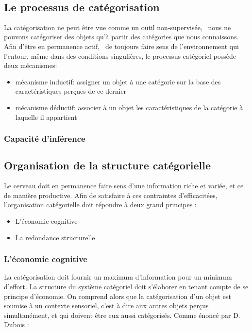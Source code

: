  \\

\subsection{Le processus de catégorisation}

La catégorisation ne peut être vue comme un outil non-supervisée, \ie~nous ne pouvons catégoriser des objets qu'à partir des catégories que nous connaissons. Afin d'être en permanence actif, \ie~de toujours faire sens de l'environnement qui l'entour, même dans des conditions singulières, le processus catégoriel possède deux mécanismes:

\begin{itemize}
\item mécanisme inductif: assigner un objet à une catégorie sur la base des caractéristiques perçues de ce dernier
\item mécanisme déductif: associer à un objet les caractéristiques de la catégorie à laquelle il appartient
\end{itemize}

\subsubsection{Capacité d'inférence}

\subsection{Organisation de la structure catégorielle}

Le cerveau doit en permanence faire sens d'une information riche et variée, et ce de manière productive. Afin de satisfaire à ces contraintes d'efficacitées, l'organisation catégorielle doit répondre à deux grand principes \citep[p. 29]{rosch1978cognition}:

\begin{itemize}
\item L'économie cognitive
\item La redondance structurelle
\end{itemize}

\subsubsection{L'économie cognitive}

La catégorisation doit fournir un maximum d'information pour un minimum d'effort. La structure du système catégoriel doit s'élaborer en tenant compte de se principe d'économie. On comprend alors que la catégorisation d'un objet est soumise à un contexte sensoriel, c'est à dire aux autres objets perçus simultanément, et qui doivent être eux aussi catégorisés. Comme énoncé par D. Dubois \citep[p. 33]{dubois1991semantique}:

